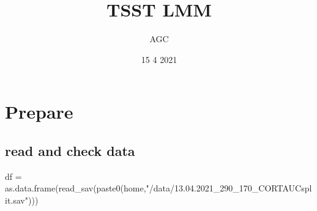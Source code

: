\documentclass[
]{article}
\title{TSST LMM}
\author{AGC}
\date{15 4 2021}
\newenvironment{Shaded}{\begin{snugshade}}{\end{snugshade}}
\newcommand{\FunctionTok}[1]{\textcolor[rgb]{0.00,0.00,0.00}{#1}}
\newcommand{\NormalTok}[1]{#1}
\newcommand{\OtherTok}[1]{\textcolor[rgb]{0.56,0.35,0.01}{#1}}
\newcommand{\StringTok}[1]{\textcolor[rgb]{0.31,0.60,0.02}{#1}}
\begin{document}
\maketitle

\hypertarget{prepare}{%
\section{Prepare}\label{prepare}}

\hypertarget{read-and-check-data}{%
\subsection{read and check data}\label{read-and-check-data}}

\begin{Shaded}
\begin{Highlighting}[]
\NormalTok{df }\OtherTok{=} \FunctionTok{as.data.frame}\NormalTok{(}\FunctionTok{read\_sav}\NormalTok{(}\FunctionTok{paste0}\NormalTok{(home,}\StringTok{"/data/13.04.2021\_290\_170\_CORTAUCsplit.sav"}\NormalTok{)))}


\end{Highlighting}
\end{Shaded}
\end{document}
